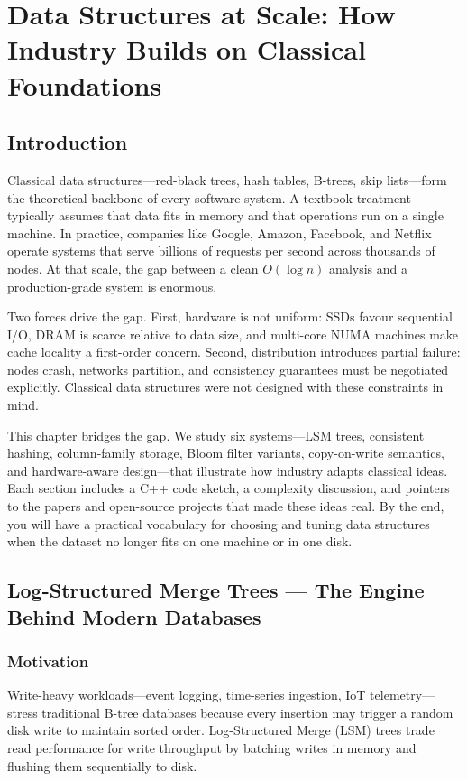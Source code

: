 \chapter{Data Structures at Scale: How Industry Builds on Classical Foundations}

\section{Introduction}

Classical data structures---red-black trees, hash tables, B-trees, skip lists---form
the theoretical backbone of every software system.  A textbook treatment typically
assumes that data fits in memory and that operations run on a single machine.  In
practice, companies like Google, Amazon, Facebook, and Netflix operate systems that
serve billions of requests per second across thousands of nodes.  At that scale,
the gap between a clean $O(\log n)$ analysis and a production-grade system is
enormous.

Two forces drive the gap.  First, hardware is not uniform: SSDs favour sequential I/O,
DRAM is scarce relative to data size, and multi-core NUMA machines make cache
locality a first-order concern.  Second, distribution introduces partial failure:
nodes crash, networks partition, and consistency guarantees must be negotiated
explicitly.  Classical data structures were not designed with these constraints in
mind.

This chapter bridges the gap.  We study six systems---LSM trees, consistent hashing,
column-family storage, Bloom filter variants, copy-on-write semantics, and
hardware-aware design---that illustrate how industry adapts classical ideas.  Each
section includes a C++ code sketch, a complexity discussion, and pointers to the
papers and open-source projects that made these ideas real.  By the end, you will
have a practical vocabulary for choosing and tuning data structures when the dataset
no longer fits on one machine or in one disk.

\section{Log-Structured Merge Trees --- The Engine Behind Modern Databases}

\subsection{Motivation}

Write-heavy workloads---event logging, time-series ingestion, IoT telemetry---stress
traditional B-tree databases because every insertion may trigger a random disk write
to maintain sorted order.  Log-Structured Merge (LSM) trees trade read performance
for write throughput by batching writes in memory and flushing them sequentially to
disk.


